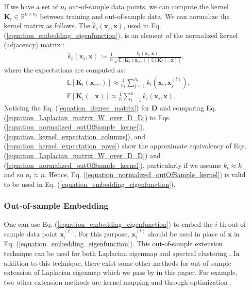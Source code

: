 \documentclass[lang=cn,10pt]{gorgeousnbook}
\numberwithin{equation}{section}%
\numberwithin{figure}{section}%
\begin{document}
If we have a set of $n_t$ out-of-sample data points, we can compute the kernel $\boldsymbol{K}_t \in \mathbb{R}^{n \times n_t}$ between training and out-of-sample data. 
We can normalize the kernel matrix \cite{ah2010normalized} as follows. 
The $\breve{k}_t(\boldsymbol{x}_i, \boldsymbol{x})$, used in Eq. (\ref{equation_embedding_eigenfunction}), is an element of the normalized kernel (adjacency) matrix \cite{bengio2003out}:
\begin{align}\label{equation_normalized_outOfSample_kernel}
\breve{k}_t(\boldsymbol{x}_i, \boldsymbol{x}) := \frac{1}{n} \frac{k_t(\boldsymbol{x}_i, \boldsymbol{x})}{\sqrt{\mathbb{E}[\boldsymbol{K}_t(\boldsymbol{x}_i, .)]\,\, \mathbb{E}[\boldsymbol{K}_t(.,\boldsymbol{x})]}},
\end{align}
where the expectations are computed as:
\begin{align}
&\mathbb{E}[\boldsymbol{K}_t(\boldsymbol{x}_i, .)] \approx \frac{1}{n_t} \sum_{j=1}^{n_t} k_t(\boldsymbol{x}_i, \boldsymbol{x}_j^{(t)}), \label{equation_kernel_expectation_columns} \\
&\mathbb{E}[\boldsymbol{K}_t(., \boldsymbol{x})] \approx \frac{1}{n} \sum_{i=1}^{n} k_t(\boldsymbol{x}_i, \boldsymbol{x}). \label{equation_kernel_expectation_rows}
\end{align}
Noticing the Eq. (\ref{equation_degree_matrix}) for $\boldsymbol{D}$ and comparing Eq. (\ref{equation_Laplacian_matrix_W_over_D_D}) to Eqs. (\ref{equation_normalized_outOfSample_kernel}), (\ref{equation_kernel_expectation_columns}), and (\ref{equation_kernel_expectation_rows}) show the approximate equivalency of Eqs. (\ref{equation_Laplacian_matrix_W_over_D_D}) and (\ref{equation_normalized_outOfSample_kernel}), particularly if we assume $k_t \approx k$ and so $n_t \approx n$. Hence, Eq. (\ref{equation_normalized_outOfSample_kernel}) is valid to be used in Eq. (\ref{equation_embedding_eigenfunction}). 

\subsubsection{Out-of-sample Embedding}

One can use Eq. (\ref{equation_embedding_eigenfunction}) to embed the $i$-th out-of-sample data point $\boldsymbol{x}_i^{(t)}$. For this purpose, $\boldsymbol{x}_i^{(t)}$ should be used in place of $\boldsymbol{x}$ in Eq. (\ref{equation_embedding_eigenfunction}). This out-of-sample extension technique can be used for both Laplacian eigenmap and spectral clustering \cite{bengio2004out}. 
In addition to this technique, there exist some other methods for out-of-sample extension of Laplacian eigenmap which we pass by in this paper. For example, two other extension methods are kernel mapping \cite{gisbrecht2012out,gisbrecht2015parametric} and through optimization \cite{bunte2012general}.
\end{document}
